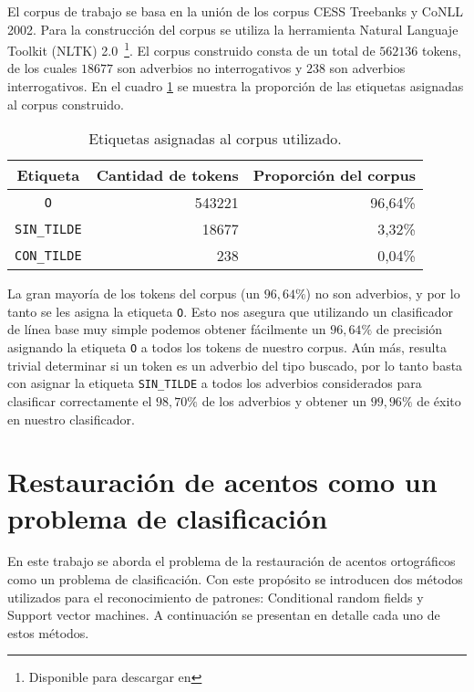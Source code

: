 \documentclass[runningheads,a4paper]{llncs}
\begin{document}
El corpus de trabajo se basa en la unión de los corpus CESS Treebanks y CoNLL 2002. Para la construcción del corpus se utiliza la herramienta Natural Languaje Toolkit (NLTK) 2.0~\footnote{Disponible para descargar en \nltk}. El corpus construido consta de un total de $562136$ tokens, de los cuales $18677$ son adverbios no interrogativos y $238$ son adverbios interrogativos. En el cuadro \ref{table:corpus} se muestra la proporci\'on de las etiquetas asignadas al corpus construido.

\begin{table}[ht]
 	\renewcommand{\arraystretch}{1.3}
	\renewcommand{\tabcolsep}{3pt}
	\caption{Etiquetas asignadas al corpus utilizado.}
	\label{table:corpus}
	\centering
	\begin{tabular}{c r r}
		\hline\hline
		\multicolumn{1}{c}{\textbf{Etiqueta}} & \multicolumn{1}{c}{\textbf{Cantidad de tokens}} & \multicolumn{1}{c}{\textbf{Proporci\'on del corpus}} \\
		\hline
		\texttt{O} & 543221 & 96,64\% \\
		\texttt{SIN\_TILDE} & 18677 & 3,32\% \\
		\texttt{CON\_TILDE} & 238 & 0,04\% \\
		\hline
	\end{tabular}
\end{table}

La gran mayoría de los tokens del corpus (un $96,64\%$)  no son adverbios, y por lo tanto se les asigna la etiqueta \texttt{\small O}. Esto nos asegura que utilizando un clasificador de línea base muy simple podemos obtener fácilmente un $96,64\%$ de precisión asignando la etiqueta \texttt{\small O} a todos los tokens de nuestro corpus. A\'un m\'as, resulta trivial determinar si un token es un adverbio del tipo buscado, por lo tanto basta con asignar la etiqueta \texttt{\small SIN\_TILDE} a todos los adverbios considerados para clasificar correctamente el $98,70\%$ de los adverbios y obtener un $99,96\%$ de \'exito en nuestro clasificador.

\section{Restauración de acentos como un problema de clasificación}
\label{sec:solucion-propuesta}

En este trabajo se aborda el problema de la restauraci\'on de acentos ortogr\'aficos como un problema de clasificaci\'on. Con este propósito se introducen dos m\'etodos utilizados para el reconocimiento de patrones: Conditional random fields y Support vector machines. A continuación se presentan en detalle cada uno de estos métodos.
\end{document}
